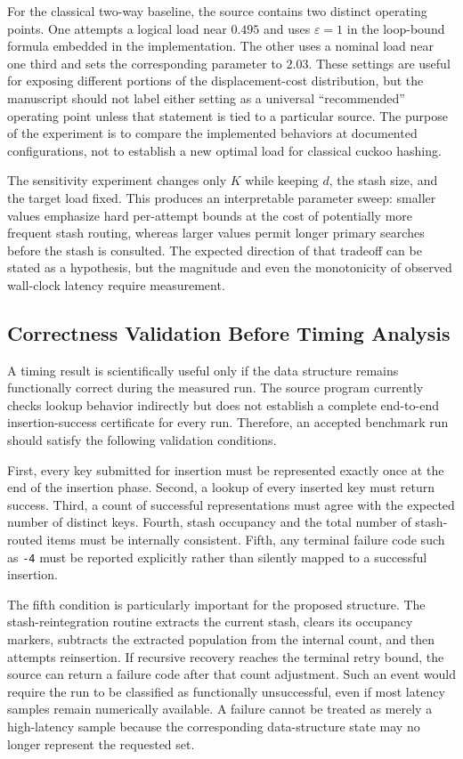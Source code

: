 \documentclass[conference]{IEEEtran}
\begin{document}
For the classical two-way baseline, the source contains two distinct operating
points. One attempts a logical load near $0.495$ and uses $\varepsilon=1$ in the
loop-bound formula embedded in the implementation. The other uses a nominal
load near one third and sets the corresponding parameter to $2.03$. These
settings are useful for exposing different portions of the displacement-cost
distribution, but the manuscript should not label either setting as a universal
``recommended'' operating point unless that statement is tied to a particular
source. The purpose of the experiment is to compare the implemented behaviors
at documented configurations, not to establish a new optimal load for
classical cuckoo hashing.

The sensitivity experiment changes only $K$ while keeping $d$, the stash size,
and the target load fixed. This produces an interpretable parameter sweep:
smaller values emphasize hard per-attempt bounds at the cost of potentially
more frequent stash routing, whereas larger values permit longer primary
searches before the stash is consulted. The expected direction of that tradeoff
can be stated as a hypothesis, but the magnitude and even the monotonicity of
observed wall-clock latency require measurement.

\subsection{Correctness Validation Before Timing Analysis}

A timing result is scientifically useful only if the data structure remains
functionally correct during the measured run. The source program currently
checks lookup behavior indirectly but does not establish a complete end-to-end
insertion-success certificate for every run. Therefore, an accepted benchmark
run should satisfy the following validation conditions.

First, every key submitted for insertion must be represented exactly once at
the end of the insertion phase. Second, a lookup of every inserted key must
return success. Third, a count of successful representations must agree with
the expected number of distinct keys. Fourth, stash occupancy and the total
number of stash-routed items must be internally consistent. Fifth, any terminal
failure code such as \texttt{-4} must be reported explicitly rather than silently
mapped to a successful insertion.

The fifth condition is particularly important for the proposed structure. The
stash-reintegration routine extracts the current stash, clears its occupancy
markers, subtracts the extracted population from the internal count, and then
attempts reinsertion. If recursive recovery reaches the terminal retry bound,
the source can return a failure code after that count adjustment. Such an event
would require the run to be classified as functionally unsuccessful, even if
most latency samples remain numerically available. A failure cannot be treated
as merely a high-latency sample because the corresponding data-structure state
may no longer represent the requested set.
\end{document}
